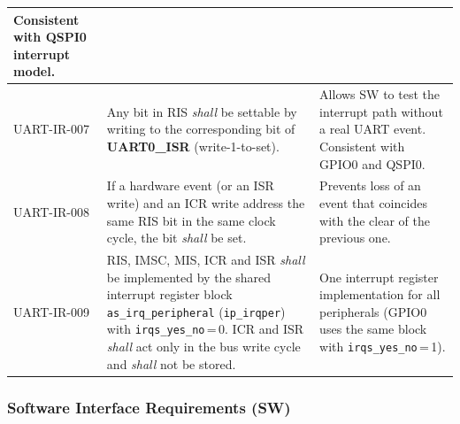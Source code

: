 \begin{table}[H]
\begin{tabularx}{\textwidth}{|l |X |X|}
    Consistent with QSPI0 interrupt model. \\
  \hline
  UART-IR-007 &
    Any bit in RIS \textit{shall} be settable by writing\;1 to the
    corresponding bit of \textbf{UART0\_ISR} (write-1-to-set). &
    Allows SW to test the interrupt path without a real UART event.
    Consistent with GPIO0 and QSPI0. \\
  \hline
  UART-IR-008 &
    If a hardware event (or an ISR write) and an ICR write address the
    same RIS bit in the same clock cycle, the bit \textit{shall} be set. &
    Prevents loss of an event that coincides with the clear of the
    previous one. \\
  \hline
  UART-IR-009 &
    RIS, IMSC, MIS, ICR and ISR \textit{shall} be implemented by the shared
    interrupt register block \texttt{as\_irq\_peripheral}
    (\texttt{ip\_irqper}) with \texttt{irqs\_yes\_no}\,=\,0. ICR and ISR
    \textit{shall} act only in the bus write cycle and \textit{shall} not be
    stored. &
    One interrupt register implementation for all peripherals (GPIO0 uses
    the same block with \texttt{irqs\_yes\_no}\,=\,1). \\
  \hline
\end{tabularx}
\end{table}

\subsubsection{Software Interface Requirements (SW)}

